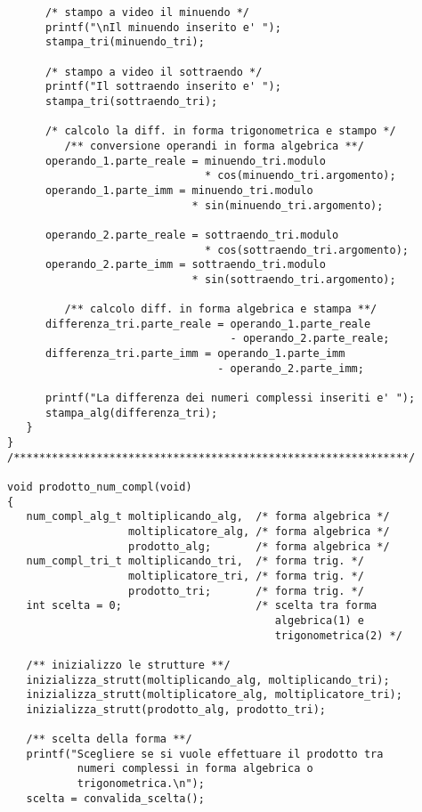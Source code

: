 \documentclass[a4paper,10pt]{article}
\begin{document}
\begin{verbatim}
      /* stampo a video il minuendo */
      printf("\nIl minuendo inserito e' ");
      stampa_tri(minuendo_tri);

      /* stampo a video il sottraendo */
      printf("Il sottraendo inserito e' ");
      stampa_tri(sottraendo_tri);

      /* calcolo la diff. in forma trigonometrica e stampo */
         /** conversione operandi in forma algebrica **/
      operando_1.parte_reale = minuendo_tri.modulo
                               * cos(minuendo_tri.argomento);
      operando_1.parte_imm = minuendo_tri.modulo
                             * sin(minuendo_tri.argomento);

      operando_2.parte_reale = sottraendo_tri.modulo
                               * cos(sottraendo_tri.argomento);
      operando_2.parte_imm = sottraendo_tri.modulo
                             * sin(sottraendo_tri.argomento);

         /** calcolo diff. in forma algebrica e stampa **/
      differenza_tri.parte_reale = operando_1.parte_reale
                                   - operando_2.parte_reale;
      differenza_tri.parte_imm = operando_1.parte_imm
                                 - operando_2.parte_imm;

      printf("La differenza dei numeri complessi inseriti e' ");
      stampa_alg(differenza_tri);
   }
}
/**************************************************************/

void prodotto_num_compl(void)
{
   num_compl_alg_t moltiplicando_alg,  /* forma algebrica */
                   moltiplicatore_alg, /* forma algebrica */
                   prodotto_alg;       /* forma algebrica */
   num_compl_tri_t moltiplicando_tri,  /* forma trig. */
                   moltiplicatore_tri, /* forma trig. */
                   prodotto_tri;       /* forma trig. */
   int scelta = 0;                     /* scelta tra forma 
                                          algebrica(1) e 
                                          trigonometrica(2) */

   /** inizializzo le strutture **/
   inizializza_strutt(moltiplicando_alg, moltiplicando_tri);
   inizializza_strutt(moltiplicatore_alg, moltiplicatore_tri);
   inizializza_strutt(prodotto_alg, prodotto_tri);

   /** scelta della forma **/
   printf("Scegliere se si vuole effettuare il prodotto tra
           numeri complessi in forma algebrica o 
           trigonometrica.\n");
   scelta = convalida_scelta();


\end{verbatim}
\end{document}

